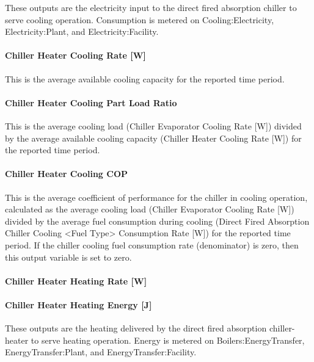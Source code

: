 These outputs are the electricity input to the direct fired absorption chiller to serve cooling operation. Consumption is metered on Cooling:Electricity, Electricity:Plant, and Electricity:Facility.

\paragraph{Chiller Heater Cooling Rate {[}W{]}}\label{chiller-heater-cooling-rate-w}

This is the average available cooling capacity for the reported time period.

\paragraph{Chiller Heater Cooling Part Load Ratio}\label{chiller-heater-cooling-part-load-ratio}

This is the average cooling load (Chiller Evaporator Cooling Rate {[}W{]}) divided by the average available cooling capacity (Chiller Heater Cooling Rate {[}W{]}) for the reported time period.

\paragraph{Chiller Heater Cooling COP}\label{chiller-heater-cooling-cop}

This is the average coefficient of performance for the chiller in cooling operation, calculated as the average cooling load (Chiller Evaporator Cooling Rate {[}W{]}) divided by the average fuel consumption during cooling (Direct Fired Absorption Chiller Cooling \textless{}Fuel Type\textgreater{} Consumption Rate {[}W{]}) for the reported time period. If the chiller cooling fuel consumption rate (denominator) is zero, then this output variable is set to zero.

\paragraph{Chiller Heater Heating Rate {[}W{]}}\label{chiller-heater-heating-rate-w}

\paragraph{Chiller Heater Heating Energy {[}J{]}}\label{chiller-heater-heating-energy-j}

These outputs are the heating delivered by the direct fired absorption chiller-heater to serve heating operation. Energy is metered on Boilers:EnergyTransfer, EnergyTransfer:Plant, and EnergyTransfer:Facility.

